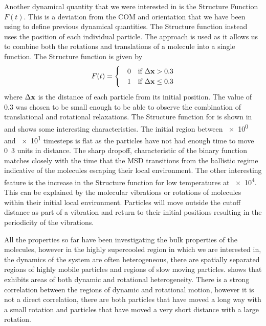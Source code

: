 Another dynamical quantity that we were interested in is the Structure Function $F(t)$. This is a deviation from the COM and orientation that we have been using to define previous dynamical quantities. The Structure function instead uses the position of each individual particle. The approach is used as it allows us to combine both the rotations and translations of a molecule into a single function. The Structure function is given by
\begin{align}
    F(t) = \begin{cases}
        \quad0 &\text{if } \Delta \mathbf{x} > 0.3 \\
        \quad1 &\text{if } \Delta \mathbf{x} \leq 0.3
    \end{cases}
\end{align}
where $\Delta \mathbf{x}$ is the distance of each particle from its initial position. The value of $0.3$ was chosen to be small enough to be able to observe the combination of translational and rotational relaxations. The Structure function for \sone is shown in  and shows some interesting characteristics. The initial region between \num{e0} and \num{e1} timesteps is flat as the particles have not had enough time to move \si{0.3} units in distance. The sharp dropoff, characteristic of the binary function matches closely with the time that the MSD transitions from the ballistic regime indicative of the molecules escaping their local environment. The other interesting feature is the increase in the Structure function for low temperatures at \num{e4}. This can be explained by the molecular vibrations or rotations of molecules within their initial local environment. Particles will move outside the cutoff distance as part of a vibration and return to their initial positions resulting in the periodicity of the vibrations.

All the properties so far have been investigating the bulk properties of the molecules, however in the highly supercooled region in which we are interested in, the dynamics of the system are often heterogeneous, there are spatially separated regions of highly mobile particles and regions of slow moving particles.  shows that \sone exhibits areas of both dynamic and rotational heterogeneity. There is a strong correlation between the regions of dynamic and rotational motion, however it is not a direct correlation, there are both particles that have moved a long way with a small rotation and particles that have moved a very short distance with a large rotation.

